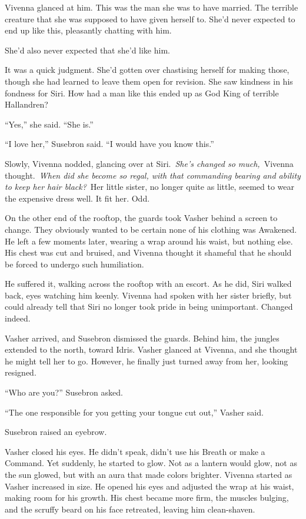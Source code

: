 Vivenna glanced at him. This was the man she was to have married. The terrible creature that she was supposed to have given herself to. She’d never expected to end up like this, pleasantly chatting with him.

She’d also never expected that she’d like him.

It was a quick judgment. She’d gotten over chastising herself for making those, though she had learned to leave them open for revision. She saw kindness in his fondness for Siri. How had a man like this ended up as God King of terrible Hallandren?

“Yes,” she said. “She is.”

“I love her,” Susebron said. “I would have you know this.”

Slowly, Vivenna nodded, glancing over at Siri.~\textit{She’s changed so much,}~Vivenna thought.~\textit{When did she become so regal, with that commanding bearing and ability to keep her hair black?}~Her little sister, no longer quite as little, seemed to wear the expensive dress well. It fit her. Odd.

On the other end of the rooftop, the guards took Vasher behind a screen to change. They obviously wanted to be certain none of his clothing was Awakened. He left a few moments later, wearing a wrap around his waist, but nothing else. His chest was cut and bruised, and Vivenna thought it shameful that he should be forced to undergo such humiliation.

He suffered it, walking across the rooftop with an escort. As he did, Siri walked back, eyes watching him keenly. Vivenna had spoken with her sister briefly, but could already tell that Siri no longer took pride in being unimportant. Changed indeed.

Vasher arrived, and Susebron dismissed the guards. Behind him, the jungles extended to the north, toward Idris. Vasher glanced at Vivenna, and she thought he might tell her to go. However, he finally just turned away from her, looking resigned.

“Who are you?” Susebron asked.

“The one responsible for you getting your tongue cut out,” Vasher said.

Susebron raised an eyebrow.

Vasher closed his eyes. He didn’t speak, didn’t use his Breath or make a Command. Yet suddenly, he started to glow. Not as a lantern would glow, not as the sun glowed, but with an aura that made colors brighter. Vivenna started as Vasher increased in size. He opened his eyes and adjusted the wrap at his waist, making room for his growth. His chest became more firm, the muscles bulging, and the scruffy beard on his face retreated, leaving him clean-shaven.


